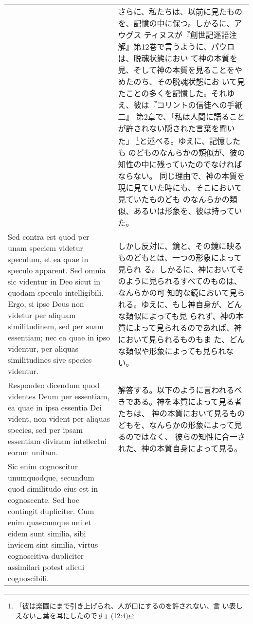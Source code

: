 \documentclass[10pt]{jsarticle} %
\begin{document}
\begin{longtable}{p{21em}p{21em}}
&

さらに、私たちは、以前に見たものを、記憶の中に保つ。しかるに、アウグス
ティヌスが『創世記逐語注解』第12巻で言うように、パウロは、脱魂状態におい
て神の本質を見、そして神の本質を見ることをやめたのち、その脱魂状態にお
いて見たことの多くを記憶した。それゆえ、彼は『コリントの信徒への手紙二』
第2章で、「私は人間に語ることが許されない隠された言葉を聞いた」
\footnote{「彼は楽園にまで引き上げられ、人が口にするのを許されない、言
い表しえない言葉を耳にしたのです」(12:4)}と述べる。ゆえに、記憶したも
のどものなんらかの類似が、彼の知性の中に残っていたのでなければならない。
同じ理由で、神の本質を現に見ていた時にも、そこにおいて見ていたものども
のなんらかの類似、あるいは形象を、彼は持っていた。
\\

{\sc  Sed contra est} quod per unam speciem videtur speculum, et
 ea quae in speculo apparent. Sed omnia sic videntur in Deo sicut in
 quodam speculo intelligibili. Ergo, si ipse Deus non videtur per
 aliquam similitudinem, sed per suam essentiam; nec ea quae in ipso
 videntur, per aliquas similitudines sive species videntur.

&

しかし反対に、鏡と、その鏡に映るものどもとは、一つの形象によって見られ
る。しかるに、神においてそのように見られるすべてのものは、なんらかの可
知的な鏡において見られる。ゆえに、もし神自身が、どんな類似によっても見
られず、神の本質によって見られるのであれば、神において見られるものもま
た、どんな類似や形象によっても見られない。

\\

{\sc Respondeo dicendum} quod videntes Deum per essentiam, ea quae in
ipsa essentia Dei vident, non vident per aliquas species, sed per
ipsam essentiam divinam intellectui eorum unitam.

&

解答する。以下のように言われるべきである。神を本質によって見る者たちは、
神の本質において見るものどもを、なんらかの形象によって見るのではなく、
彼らの知性に合一された、神の本質自身によって見る。

\\

Sic enim cognoscitur unumquodque, secundum quod similitudo eius est in
cognoscente. Sed hoc contingit dupliciter. Cum enim quaecumque uni et
eidem sunt similia, sibi invicem sint similia, virtus cognoscitiva
dupliciter assimilari potest alicui cognoscibili. 

&


\end{longtable}
\end{document}
